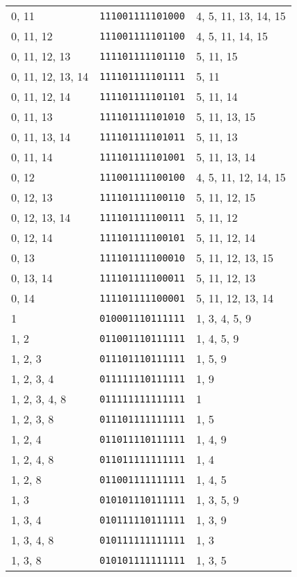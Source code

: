 \documentclass[a4paper,12pt]{article}
\begin{document}
\begin{longtable}{l|l|l}
        0, 11&\texttt{111001111101000}&4, 5, 11, 13, 14, 15\\
        0, 11, 12&\texttt{111001111101100}&4, 5, 11, 14, 15\\
        0, 11, 12, 13&\texttt{111101111101110}&5, 11, 15\\
        0, 11, 12, 13, 14&\texttt{111101111101111}&5, 11\\
        0, 11, 12, 14&\texttt{111101111101101}&5, 11, 14\\
        0, 11, 13&\texttt{111101111101010}&5, 11, 13, 15\\
        0, 11, 13, 14&\texttt{111101111101011}&5, 11, 13\\
        0, 11, 14&\texttt{111101111101001}&5, 11, 13, 14\\
        0, 12&\texttt{111001111100100}&4, 5, 11, 12, 14, 15\\
        0, 12, 13&\texttt{111101111100110}&5, 11, 12, 15\\
        0, 12, 13, 14&\texttt{111101111100111}&5, 11, 12\\
        0, 12, 14&\texttt{111101111100101}&5, 11, 12, 14\\
        0, 13&\texttt{111101111100010}&5, 11, 12, 13, 15\\
        0, 13, 14&\texttt{111101111100011}&5, 11, 12, 13\\
        0, 14&\texttt{111101111100001}&5, 11, 12, 13, 14\\
        1&\texttt{010001110111111}&1, 3, 4, 5, 9\\
        1, 2&\texttt{011001110111111}&1, 4, 5, 9\\
        1, 2, 3&\texttt{011101110111111}&1, 5, 9\\
        1, 2, 3, 4&\texttt{011111110111111}&1, 9\\
        1, 2, 3, 4, 8&\texttt{011111111111111}&1\\
        1, 2, 3, 8&\texttt{011101111111111}&1, 5\\
        1, 2, 4&\texttt{011011110111111}&1, 4, 9\\
        1, 2, 4, 8&\texttt{011011111111111}&1, 4\\
        1, 2, 8&\texttt{011001111111111}&1, 4, 5\\
        1, 3&\texttt{010101110111111}&1, 3, 5, 9\\
        1, 3, 4&\texttt{010111110111111}&1, 3, 9\\
        1, 3, 4, 8&\texttt{010111111111111}&1, 3\\
        1, 3, 8&\texttt{010101111111111}&1, 3, 5\\

\end{longtable}
\end{document}
